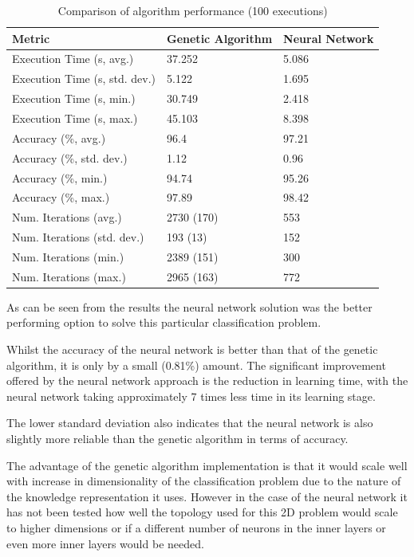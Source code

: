 \documentclass[a4paper]{article}
\begin{document}
\begin{table}[h!]
  \centering
  \begin{tabular}{@{}lll@{}}
    \toprule
    Metric                        & Genetic Algorithm & Neural Network \\
    \midrule
    Execution Time (s, avg.)      & 37.252            & 5.086          \\
    Execution Time (s, std. dev.) & 5.122             & 1.695          \\
    Execution Time (s, min.)      & 30.749            & 2.418          \\
    Execution Time (s, max.)      & 45.103            & 8.398          \\
    Accuracy (\%, avg.)           & 96.4              & 97.21          \\
    Accuracy (\%, std. dev.)      & 1.12              & 0.96           \\
    Accuracy (\%, min.)           & 94.74             & 95.26          \\
    Accuracy (\%, max.)           & 97.89             & 98.42          \\
    Num. Iterations (avg.)        & 2730 (170)        & 553            \\
    Num. Iterations (std. dev.)   & 193 (13)          & 152            \\
    Num. Iterations (min.)        & 2389 (151)        & 300            \\
    Num. Iterations (max.)        & 2965 (163)        & 772            \\
    \bottomrule
  \end{tabular}
  \caption{Comparison of algorithm performance (100 executions)}
  \label{tab:comparison_avg}
\end{table}

As can be seen from the results the neural network solution was the better
performing option to solve this particular classification problem.

Whilst the accuracy of the neural network is better than that of the genetic
algorithm, it is only by a small (0.81\%) amount. The significant improvement
offered by the neural network approach is the reduction in learning time, with
the neural network taking approximately 7 times less time in its learning stage.

The lower standard deviation also indicates that the neural network is also
slightly more reliable than the genetic algorithm in terms of accuracy.

The advantage of the genetic algorithm implementation is that it would scale
well with increase in dimensionality of the classification problem due to the
nature of the knowledge representation it uses. However in the case of the
neural network it has not been tested how well the topology used for this 2D
problem would scale to higher dimensions or if a different number of neurons in
the inner layers or even more inner layers would be needed.

\printbibliography
\end{document}
